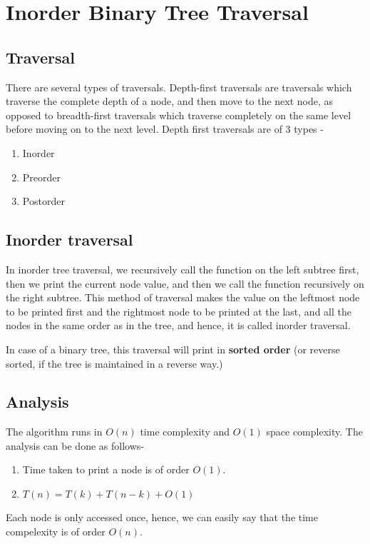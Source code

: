 \section{Inorder Binary Tree Traversal}

\subsection{Traversal}
There are several types of traversals. Depth-first traversals are traversals which traverse the complete depth of a node, and then move to the next node, as opposed to breadth-first traversals which traverse completely on the same level before moving on to the next level. Depth first traversals are of 3 types -
\begin{enumerate}
	\item{Inorder}
	\item{Preorder}
	\item{Postorder}
\end{enumerate}
\subsection{Inorder traversal}
In inorder tree traversal, we recursively call the function on the left subtree first, then we print the current node value, and then we call the function recursively on the right subtree.
This method of traversal makes the value on the leftmost node to be printed first and the rightmost node to be printed at the last, and all the nodes in the same order as in the tree, and hence, it is called inorder traversal. \cite{inorder}

In case of a binary tree, this traversal will print in \textbf{sorted order} (or reverse sorted, if the tree is maintained in a reverse way.)

\subsection{Analysis}
The algorithm runs in $O(n)$ time complexity and $O(1)$ space complexity. The analysis can be done as follows- 
\begin{enumerate}
	\item{Time taken to print a node is of order $O(1)$.}
	\item{$ T(n) = T(k) + T(n-k) + O(1) $}
\end{enumerate}
Each node is only accessed once, hence, we can easily say that the time compelexity is of order $O(n)$.